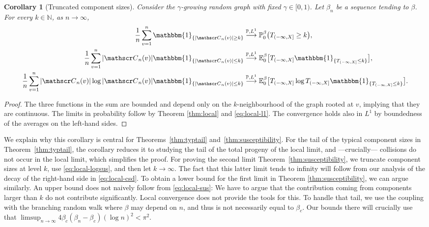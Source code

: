 \documentclass[a4paper, a4wide, 10pt, reqno]{amsart}
\theoremstyle{plain}
\newtheorem{corollary}[theorem]{Corollary}
\theoremstyle{definition}
\numberwithin{equation}{section}
\newcommand{\N}{{\mathbb N}}
\newcommand{\E}{\mathbb E}
\newcommand{\Prob}{\mathbb{P}}
\newcommand{\sC}{{\mathscr C}}
\newcommand{\ind}[1]{\mathbbm{1}_{\{#1\}}}
\begin{document}
    \begin{corollary}[Truncated component sizes]\label{cor:truncated}
    Consider the $\gamma$-growing random graph with fixed $\gamma\in[0, 1)$. Let $\beta_n$ be a sequence tending to $\beta$. For every $k\in\N$, as $n\to\infty$,
        \begin{align}
            \frac{1}{n}\sum_{v=1}^n\ind{|\sC_n(v)|\ge k}&\overset{\Prob, L^1}{\longrightarrow} \Prob^{\beta}_{0}\big(T_{(-\infty, X]}\ge k\big),\label{eq:local-csd} \\
            \frac{1}{n}\sum_{v=1}^n|\sC_n(v)|\ind{|\sC_n(v)|\le k}&\overset{\Prob, L^1}{\longrightarrow} \E^{\beta}_{0}\big[T_{(-\infty, X]}\ind{T_{(-\infty, X]}\le k}\big],\label{eq:local-sus}\\
            \frac{1}{n}\sum_{v=1}^n|\sC_n(v)|\log|\sC_n(v)|\ind{|\sC_n(v)|\le k}&\overset{\Prob, L^1}{\longrightarrow} \E^{\beta}_{0}\big[T_{(-\infty, X]}\log T_{(-\infty, X]}\ind{T_{(-\infty, X]}\le k}\big].\label{eq:local-logsus}
        \end{align}
    \end{corollary}
    \begin{proof}
        The three functions in the sum are bounded and depend only on the $k$-neighbourhood of the graph rooted at $v$, implying that they are continuous. The limits in probability follow by Theorem \ref{thm:local} and \eqref{eq:local-l1}. The convergence holds also in $L^1$ by boundedness of the averages on the left-hand sides.
    \end{proof}
    We explain why this corollary is central for Theorems~\ref{thm:typtail} and~\ref{thm:susceptibility}. For the tail of the typical component sizes in Theorem~\ref{thm:typtail}, the corollary reduces it to studying the tail of the total progeny of the local limit, and ---crucially--- collisions do not occur in the local limit, which simplifies the proof. For proving the second limit Theorem~\ref{thm:susceptibility},  we  truncate component sizes at level $k$, use \eqref{eq:local-logsus}, and then let $k\to\infty$. The fact that this latter limit tends to infinity will follow from our analysis of the decay of the right-hand side in \eqref{eq:local-csd}.  To obtain a lower bound for the  first limit in Theorem \ref{thm:susceptibility}, we can argue similarly. An upper bound does not naively follow from \eqref{eq:local-sus}: We have to argue that the contribution coming from components larger than $k$ do not contribute significantly. Local convergence does not provide the tools for this. To handle that tail, we use the coupling with the branching random walk where $\beta$ may depend on $n$, and thus is not necessarily equal to $\beta_c$. Our bounds there will crucially use that  $\limsup_{n\to\infty} 4\beta_c(\beta_n-\beta_c)(\log n)^2<\pi^2$.
\end{document}
